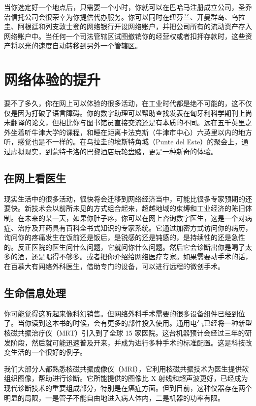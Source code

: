 当你选定好一个地点后，只需要一个小时，你就可以在巴哈马注册成立公司，圣乔治信托公司会很荣幸为你提供代办服务。你可以同时在纽芬兰、开曼群岛、乌拉圭、阿根廷和列支敦士登的网络银行开设网络账户，并把公司所有的流动资产存入网络账户中。当任何一个司法管辖区试图撤销你的经营权或者扣押存款时，这些资产将以光的速度自动转移到另外一个管辖区。

\section{网络体验的提升}
要不了多久，你在网上可以体验的很多活动，在工业时代都是绝不可能的，这不仅仅是因为打破了语言障碍。你的数字助理可以帮助查找发表在匈牙利科学期刊上尚未翻译的论文，但相比你与图书馆员直接交流还是有本质的不同。远在五千英里之外坐着听牛津大学的课程，和睡在距离卡法克斯（牛津市中心）六英里以内的地方听，感觉也是不一样的。在乌拉圭的埃斯特角城（Punte del Este）的聚会上，通过虚拟现实，到蒙特卡洛的巴黎酒店玩轮盘赌，更是一种新奇的体验。

\subsection{在网上看医生}
现实生活中的很多活动，很快将会迁移到网络经济当中，可能比很多专家预期的还要快。新技术会以前所未见的方式组合起来，超越地域的束缚和工业经济的陈旧体制。在未来的某一天，如果你肚子疼，你可以在网上咨询数字医生，这是一个对病症、治疗及开药具有百科全书式知识的专家系统。它通过加密方式访问你的病历，询问你的疼痛发生在饭前还是饭后，是锐感的还是钝感的，是持续性的还是急性的。反正医院的医生问什么问题，它就问你什么问题。然后它会诊断出你是喝了太多的酒，还是喝得不够多。或者把你介绍给网络医疗专家。如果需要动手术的话，在百慕大有网络外科医生，借助专门的设备，可以进行远程的微创手术。

\subsection{生命信息处理}
你可能觉得这听起来像科幻销售。但网络外科手术需要的很多设备组件已经到位了。当你读到这本书的时候，会有更多的部件投入使用。通用电气已经将一种新型核磁共振治疗仪（MRT）引入到了全球 15 家医院。这台机器预计会经过三年的研发阶段，然后就可能迅速普及开来，并成为进行多种手术的标准配置。这是科技改变生活的一个很好的例子。

我们大部分人都熟悉核磁共振成像仪（MRI），它利用核磁共振技术为医生提供软组织图像，帮助进行诊断。它所能提供的图像比 X 射线和超声波更好，已经成为现代诊断技术的重要组成部分，特别是在癌症方面。但到目前，这种仪器存在两个明显的局限，一是管子不能自由地进入病人体内，二是机器的功率有限。

